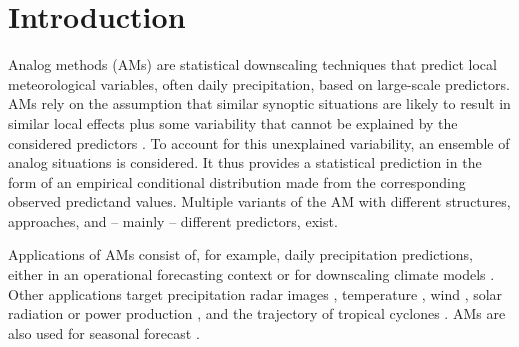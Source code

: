 \documentclass[alpha-refs]{wiley-article}
\begin{document}
\linenumbers

\section{Introduction}

Analog methods (AMs) are statistical downscaling techniques that predict local meteorological variables, often daily precipitation, based on large-scale predictors. AMs rely on the assumption that similar synoptic situations are likely to result in similar local effects plus some variability that cannot be explained by the considered predictors \citep{Lorenz1969}. To account for this unexplained variability, an ensemble of analog situations is considered. It thus provides a statistical prediction in the form of an empirical conditional distribution made from the corresponding observed predictand values. Multiple variants of the AM with different structures, approaches, and -- mainly -- different predictors, exist.

Applications of AMs consist of, for example, daily precipitation predictions, either in an operational forecasting context \citep[e.g.][]{Bontron2005, Hamill2006, Bliefernicht2010, Marty2012, Horton2012, Hamill2015, BenDaoud2016} or for downscaling climate models \citep[e.g.][]{Zorita1999, Wetterhall2005, Wetterhall2007, Matulla2007, Radanovics2013, Chardon2014, Dayon2015, Raynaud2016b}. Other applications target precipitation radar images \citep{Panziera2011, Foresti2015a}, temperature \citep{Kruizinga1983, DelleMonache2013, Caillouet2016, Raynaud2016b}, wind \citep{DelleMonache2013, DelleMonache2011, Vanvyve2015, Alessandrini2015, Junk2015, Junk2015c}, solar radiation or power production \citep{Alessandrini2015a, Bessa2015, Raynaud2016b}, and the trajectory of tropical cyclones \citep{Sievers2000, Fraedrich2003}. AMs are also used for seasonal forecast \citep{Xavier2007, Charles2012, Wu2012, Shao2013}.
\end{document}

